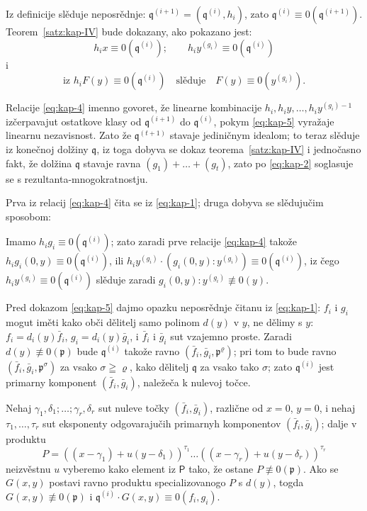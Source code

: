 \documentclass[11pt]{article}
\theoremstyle{plain}
\begin{document}
Iz definicije slěduje neposrědnje:
$\mathfrak{q}^{(i+1)} = (\mathfrak{q}^{(i)}, h_{i})$, zato
$\mathfrak{q}^{(i)} \equiv 0(\mathfrak{q}^{(i+1)})$.
Teorem~\ref{satz:kap-IV} bude dokazany, ako pokazano jest:
\begin{equation}\label{eq:kap-4}
h_{i}x \equiv 0(\mathfrak{q}^{(i)}); \qquad
h_{i}y^{(g_{i})} \equiv 0(\mathfrak{q}^{(i)})
\end{equation}
i
\begin{equation}\label{eq:kap-5}
\text{iz } h_{i}F(y) \equiv 0(\mathfrak{q}^{(i)})
\quad \text{slěduje} \quad F(y) \equiv 0(y^{(g_{i})}).
\end{equation}

Relacije \eqref{eq:kap-4} imenno govoret, že linearne kombinacije
$h_{i}, h_{i}y, \ldots, h_{i}y^{(g_{i})-1}$ izčerpavajut
ostatkove klasy od $\mathfrak{q}^{(i+1)}$ do
$\mathfrak{q}^{(i)}$, pokym \eqref{eq:kap-5} vyražaje linearnu
nezavisnost. Zato že $\mathfrak{q}^{(t+1)}$ stavaje jediničnym
idealom; to teraz slěduje iz konečnoj dolžiny $\mathfrak{q}$,
iz toga dobyva se dokaz teorema~\ref{satz:kap-IV} i jednočasno
fakt, že dolžina $\mathfrak{q}$ stavaje ravna
$(g_1)+\ldots+(g_t)$, zato po \eqref{eq:kap-2} soglasuje se
s rezultanta-mnogokratnostju.

Prva iz relacij \eqref{eq:kap-4} čita se iz \eqref{eq:kap-1};
druga dobyva se slědujučim sposobom:

Imamo $h_{i}g_{i} \equiv 0(\mathfrak{q}^{(i)})$; zato zaradi prve
relacije \eqref{eq:kap-4} takože
$h_{i}g_{i}(0,y) \equiv 0(\mathfrak{q}^{(i)})$, ili
$h_iy^{(g_i)}\cdot(g_i(0,y):y^{(g_i)})\equiv0(\mathfrak{q}^{(i)})$,
iz čego $h_{i}y^{(g_{i})} \equiv 0(\mathfrak{q}^{(i)})$
slěduje zaradi $g_{i}(0,y):y^{(g_{i})} \not\equiv 0(y)$.

Pred dokazom \eqref{eq:kap-5} dajmo opazku neposrědnje čitanu iz
\eqref{eq:kap-1}: $f_{i}$ i $g_{i}$ mogut iměti kako obči dělitelj
samo polinom $d(y)$ v $y$, ne dělimy s $y$:
$f_{i} = d_{i}(y)\bar{f}_{i}$, $g_{i} = d_{i}(y)\bar{g}_{i}$, i
$\bar{f}_{i}$ i $\bar{g}_{i}$ sut vzajemno proste. Zaradi
$d(y)\not\equiv0(\mathfrak{p})$ bude $\mathfrak{q}^{(i)}$
takože ravno $(\bar f_i,\bar g_i,\mathfrak{p}^\varrho)$;
pri tom to bude ravno
$(\bar{f}_{i}, \bar{g}_{i}, \mathfrak{p}^{\sigma})$ za vsako
$\sigma\geqq\varrho$, kako dělitelj $\mathfrak{q}$ za vsako
tako $\sigma$; zato $\mathfrak{q}^{(i)}$ jest primarny komponent
$(\bar{f}_{i}, \bar{g}_{i})$, naležeča k nulevoj točce.

Nehaj $\gamma_{1}, \delta_{1}; \ldots; \gamma_{r}, \delta_{r}$ sut
nuleve točky $(\bar{f}_{i}, \bar{g}_{i})$, različne od
$x = 0$, $y = 0$, i nehaj $\tau_{1}, \ldots, \tau_{r}$ sut eksponenty
odgovarajučih primarnyh komponentov $(\bar{f}_{i}, \bar{g}_{i})$;
dalje v produktu
\[
P = ((x-\gamma_{1}) + u(y-\delta_{1}))^{\tau_{1}} \ldots
((x-\gamma_{r}) + u(y-\delta_{r}))^{\tau_{r}}
\]
neizvěstnu $u$ vyberemo kako element iz $\mathsf{P}$ tako, že ostane
$P \not\equiv 0(\mathfrak{p})$. Ako se $G(x,y)$ postavi ravno
produktu specializovanogo $P$ s $d(y)$, togda
$G(x,y) \not\equiv 0(\mathfrak{p})$ i
$\mathfrak{q}^{(i)} \cdot G(x,y) \equiv 0(f_{i}, g_{i})$.
\end{document}
